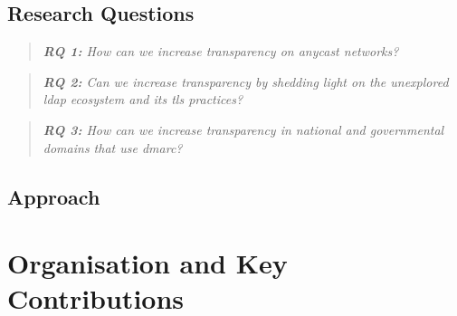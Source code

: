 \subsection*{Research Questions}

\begin{quote}
    \itshape \textbf{RQ 1:} How can we increase transparency on anycast networks?
\end{quote}

\begin{quote}
    \itshape \textbf{RQ 2:} Can we increase transparency by shedding light on the unexplored \acrshort{ldap} ecosystem and its \gls{tls} practices?
\end{quote}

\begin{quote}
    \itshape \textbf{RQ 3:} How can we increase transparency in national and governmental domains that use \acrshort{dmarc}?
\end{quote}

\subsection*{Approach}

\section{Organisation and Key Contributions}
\label{sec:intro-org-key-contrib}
